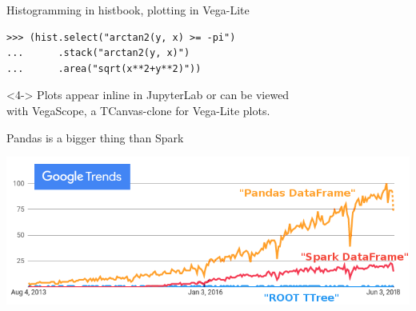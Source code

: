 \documentclass[aspectratio=169]{beamer}
\begin{document}
\begin{frame}[fragile]{Histogramming in histbook, plotting in Vega-Lite}
\begin{uncoverenv}
\vspace{-2.5 cm}
\scriptsize
\begin{verbatim}
>>> (hist.select("arctan2(y, x) >= -pi")
...      .stack("arctan2(y, x)")
...      .area("sqrt(x**2+y**2)"))
\end{verbatim}
\normalsize
\end{uncoverenv}

\vspace{0.2 cm}
\begin{uncoverenv}<4->
Plots appear inline in JupyterLab or can be viewed \\
with VegaScope, a TCanvas-clone for Vega-Lite plots.
\end{uncoverenv}
\end{frame}

\begin{frame}{Pandas is a bigger thing than Spark}
\vspace{0.5 cm}
\begin{center}
\includegraphics[width=0.8\linewidth]{root-spark-pandas-google-trends.png}
\end{center}
\end{frame}
\end{document}
